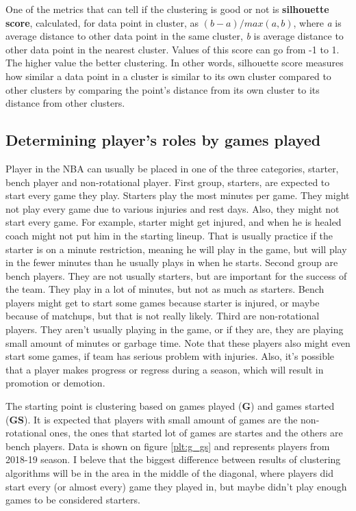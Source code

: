 \documentclass[a4paper]{article}
\begin{document}
One of the metrics that can tell if the clustering is good or not is \textbf{silhouette score}, calculated, for data point in cluster, as $ (b - a)  / max(a, b) $, where \textit{a} is average distance to other data point in the same cluster, \textit{b} is average distance to other data point in the nearest cluster. Values of this score can go from -1 to 1. The higher value the better clustering. In other words, silhouette score measures how similar a data point in a cluster is similar to its own cluster compared to other clusters by comparing the point’s distance from its own cluster to its distance from other clusters. \cite{clustering}

\subsection{Determining player's roles by games played}
\label{subsec:players_roles}

Player in the NBA can usually be placed in one of the three categories, starter, bench player and non-rotational player. First group, starters, are expected to start every game they play. Starters play the most minutes per game. They might not play every game due to various injuries and rest days. Also, they might not start every game. For example, starter might get injured, and when he is healed coach might not put him in the starting lineup. That is usually practice if the starter is on a minute restriction, meaning he will play in the game, but will play in the fewer minutes than he usually plays in when he starts. Second group are bench players. They are not usually starters, but are important for the success of the team. They play in a lot of minutes, but not as much as starters. Bench players might get to start some games because starter is injured, or maybe because of matchups, but that is not really likely. Third are non-rotational players. They aren't usually playing in the game, or if they are, they are playing small amount of minutes or garbage time. Note that these players also might even start some games, if team has serious problem with injuries. Also, it's possible that a player makes progress or regress during a season, which will result in promotion or demotion.

The starting point is clustering based on games played (\textbf{G}) and games started (\textbf{GS}). It is expected that players with small amount of games are the non-rotational ones, the ones that started lot of games are startes and the others are bench players. Data is shown on figure \ref{plt:g_gs} and represents players from 2018-19 season. I beleve that the biggest difference between results of clustering algorithms will be in the area in the middle of the diagonal, where players did start every (or almost every) game they played in, but maybe didn't play enough games to be considered starters.
\end{document}
